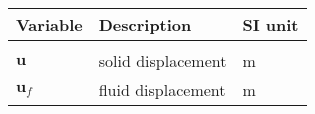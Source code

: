 \begin{table}[H]
  \centering
  \begin{tabular}{lll}
    \textbf{Variable} & \textbf{Description} & \textbf{SI unit} \\\hline\\[-9px]
    $\bm{u}$ & solid displacement & m \\[2px]
    $\bm{u}_f$ & fluid displacement & m \\[2px]
  \end{tabular}
\end{table}
